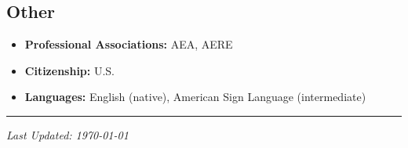 \documentclass[11pt]{res} %
\begin{document}
\begin{resume}
\vspace{-.2in}

\subsection{Other}

\begin{itemize}
	\item[] \textbf{Professional Associations:} AEA, AERE
	\item[] \textbf{Citizenship:} U.S.
	\item[] \textbf{Languages:} English (native), American Sign Language (intermediate)
\end{itemize}
\hrule

\vspace{0.1in} %



\centerline{\emph{Last Updated: \today}}
\pagebreak



\end{resume}
\end{document}
